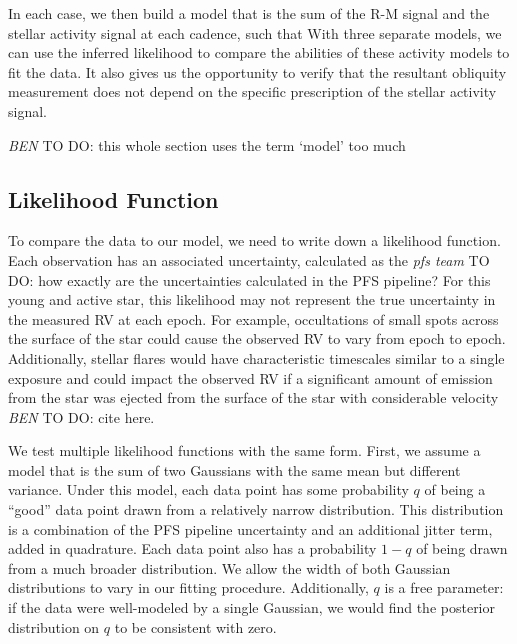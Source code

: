 \documentclass[twocolumn]{aastex63}
\newcommand{\todo}[3]{{\color{#2} \emph{#1} TO DO: #3}}
\newcommand{\btmtodo}[1]{\todo{BEN}{blue}{#1}}
\begin{document}
In each case, we then build a model that is the sum of the R-M signal and the stellar activity signal at each cadence, such that
With three separate models, we can use the inferred likelihood to compare the abilities of these activity models to fit the data. 
It also gives us the opportunity to verify that the resultant obliquity measurement does not depend on the specific prescription of the stellar activity signal.

\btmtodo{this whole section uses the term `model' too much}



\subsection{Likelihood Function}

To compare the data to our model, we need to write down a likelihood function. 
Each observation has an associated uncertainty, calculated as the \todo{pfs team}{red}{how exactly are the uncertainties calculated in the PFS pipeline?}
For this young and active star, this likelihood may not represent the true uncertainty in the measured RV at each epoch. 
For example, occultations of small spots across the surface of the star could cause the observed RV to vary from epoch to epoch. 
Additionally, stellar flares would have characteristic timescales similar to a single exposure and could impact the observed RV if a significant amount of emission from the star was ejected from the surface of the star with considerable velocity \btmtodo{cite here}.

We test multiple likelihood functions with the same form.
First, we assume a model that is the sum of two Gaussians with the same mean but different variance. 
Under this model, each data point has some probability $q$ of being a ``good'' data point drawn from a relatively narrow distribution. This distribution is a combination of the PFS pipeline uncertainty and an additional jitter term, added in quadrature. 
Each data point also has a probability $1-q$ of being drawn from a much broader distribution. We allow the width of both Gaussian distributions to vary in our fitting procedure. 
Additionally, $q$ is a free parameter: if the data were well-modeled by a single Gaussian, we would find the posterior distribution on $q$ to be consistent with zero.
\end{document}
